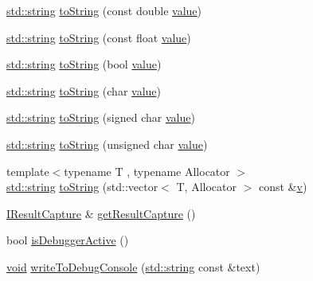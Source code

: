 \begin{DoxyCompactItemize}
\hyperlink{_s_d_l__opengl__glext_8h_ae84541b4f3d8e1ea24ec0f466a8c568b}{std\+::string} \hyperlink{namespace_catch_a3eb4356d09b7ef3286f6c1c1efe8cabf}{to\+String} (const double \hyperlink{_s_d_l__opengl__glext_8h_a8ad81492d410ff2ac11f754f4042150f}{value})
\item 
\hyperlink{_s_d_l__opengl__glext_8h_ae84541b4f3d8e1ea24ec0f466a8c568b}{std\+::string} \hyperlink{namespace_catch_a80b6411e2cba89e58aa8feb960d045d5}{to\+String} (const float \hyperlink{_s_d_l__opengl__glext_8h_a8ad81492d410ff2ac11f754f4042150f}{value})
\item 
\hyperlink{_s_d_l__opengl__glext_8h_ae84541b4f3d8e1ea24ec0f466a8c568b}{std\+::string} \hyperlink{namespace_catch_a5d3bdb2ec0e6f415e2a1a0e4914d7d3a}{to\+String} (bool \hyperlink{_s_d_l__opengl__glext_8h_a8ad81492d410ff2ac11f754f4042150f}{value})
\item 
\hyperlink{_s_d_l__opengl__glext_8h_ae84541b4f3d8e1ea24ec0f466a8c568b}{std\+::string} \hyperlink{namespace_catch_a25a0a78cbb62ea08b5d49e443051c387}{to\+String} (char \hyperlink{_s_d_l__opengl__glext_8h_a8ad81492d410ff2ac11f754f4042150f}{value})
\item 
\hyperlink{_s_d_l__opengl__glext_8h_ae84541b4f3d8e1ea24ec0f466a8c568b}{std\+::string} \hyperlink{namespace_catch_a0a5d9d0965d0d2a0663773732283713e}{to\+String} (signed char \hyperlink{_s_d_l__opengl__glext_8h_a8ad81492d410ff2ac11f754f4042150f}{value})
\item 
\hyperlink{_s_d_l__opengl__glext_8h_ae84541b4f3d8e1ea24ec0f466a8c568b}{std\+::string} \hyperlink{namespace_catch_a5d83eaeb68579a556c86cc05f7a7765f}{to\+String} (unsigned char \hyperlink{_s_d_l__opengl__glext_8h_a8ad81492d410ff2ac11f754f4042150f}{value})
\item 
{\footnotesize template$<$typename T , typename Allocator $>$ }\\\hyperlink{_s_d_l__opengl__glext_8h_ae84541b4f3d8e1ea24ec0f466a8c568b}{std\+::string} \hyperlink{namespace_catch_a2899237fef39daaae9a22e7846c0a9bf}{to\+String} (std\+::vector$<$ T, Allocator $>$ const \&\hyperlink{_s_d_l__opengl_8h_a10a82eabcb59d2fcd74acee063775f90}{v})
\item 
\hyperlink{struct_catch_1_1_i_result_capture}{I\+Result\+Capture} \& \hyperlink{namespace_catch_aff60c1de6ac6cea30175d70e33d83c8e}{get\+Result\+Capture} ()
\item 
bool \hyperlink{namespace_catch_ab079497368fb1df25af39ad494d2a241}{is\+Debugger\+Active} ()
\item 
\hyperlink{_s_d_l__opengles2__gl2ext_8h_ae5d8fa23ad07c48bb609509eae494c95}{void} \hyperlink{namespace_catch_aa5dcf4750ce9a854f4b74d3c952d13cc}{write\+To\+Debug\+Console} (\hyperlink{_s_d_l__opengl__glext_8h_ae84541b4f3d8e1ea24ec0f466a8c568b}{std\+::string} const \&text)

\end{DoxyCompactItemize}
